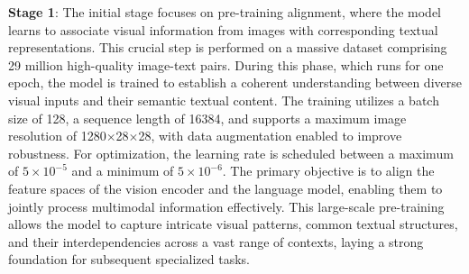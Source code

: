 \documentclass[11pt, a4paper,logo,  copyright, nonumbering]{paddleocr}
\begin{document}
\textbf{Stage 1}: The initial stage focuses on pre-training alignment, where the model learns to associate visual information from images with corresponding textual representations. This crucial step is performed on a massive dataset comprising 29 million high-quality image-text pairs. During this phase, which runs for one epoch, the model is trained to establish a coherent understanding between diverse visual inputs and their semantic textual content. The training utilizes a batch size of 128, a sequence length of 16384, and supports a maximum image resolution of 1280$\times$28$\times$28, with data augmentation enabled to improve robustness. For optimization, the learning rate is scheduled between a maximum of $5 \times 10^{-5}$ and a minimum of $5 \times 10^{-6}$. The primary objective is to align the feature spaces of the vision encoder and the language model, enabling them to jointly process multimodal information effectively. This large-scale pre-training allows the model to capture intricate visual patterns, common textual structures, and their interdependencies across a vast range of contexts, laying a strong foundation for subsequent specialized tasks.
\end{document}
